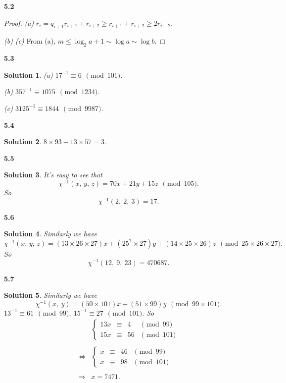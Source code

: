 \documentclass[12pt,a4paper]{article}
\newcommand{\lra}{\Longrightarrow}
\theoremstyle{solution}
\newtheorem*{sol}{Solution}
\begin{document}
\textbf{5.2}

\begin{proof}

{\em (a) }$r_i=q_{i+1}r_{i+1}+r_{i+2}\geq r_{i+1}+r_{i+2} \geq 2r_{i+2}.$

{\em (b) (c) }From (a), $m\leq \log_2 a +1 \sim \log a \sim \log b.$
\end{proof}

\textbf{5.3}

\begin{sol}

 {\em (a)} $17^{-1} \equiv 6\ \ \pmod{101}.$

{\em (b)} $357^{-1} \equiv 1075\ \ \pmod{1234}.$

{\em (c)} $3125^{-1} \equiv 1844\ \ \pmod{9987}.$
\end{sol}

\textbf{5.4}

\begin{sol} $8 \times 93 -13\times 57=3.$  \end{sol}

\textbf{5.5}

\begin{sol}
It's easy to see that
$$\chi^{-1}(x,\,y,\,z)=70x+21y+15z\ \  \pmod{105}.$$
So
$$\chi^{-1}(2,~2,~3)=17.$$
\end{sol}

\textbf{5.6}

\begin{sol}
Similarly we have
$$\chi^{-1}(x,\,y,\,z)=(13\times 26 \times 27)x+(25^2\times 27)y+(14\times25\times26)z\ \ \pmod{25\times26\times27}.$$
So
$$\chi^{-1}(12,~9,~23)= 470687.$$
\end{sol}

\textbf{5.7}

\begin{sol}
Similarly we have
$$\chi^{-1}(x,~y)=(50\times 101)x+(51\times 99)y\ \ \pmod{99\times 101}.$$
$13^{-1} \equiv 61\ \ \pmod{99},~15^{-1}\equiv 27\ \ \pmod{101}.$ So
$$
\begin{array}{rl}
 &\left\{
   \begin{array}{rclc}
   13x&\equiv &4  &\pmod{99}\\
   15x&\equiv &56 &\pmod{101}
   \end{array} \right. \\
   &\\
\Longleftrightarrow &
\left\{
   \begin{array}{rclc}
   x&\equiv &46  &\pmod{99}\\
   x&\equiv &98 &\pmod{101}
   \end{array}\right.\\
   &\\
\lra &x=7471.
\end{array}
$$
\end{sol}
\end{document}
